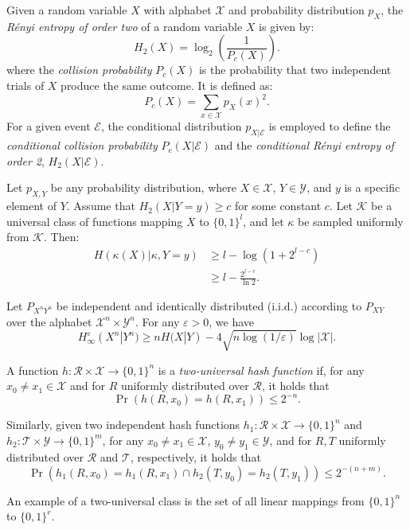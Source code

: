 \documentclass[runningheads]{llncs}
\begin{document}
\begin{definition}\label{Renyi entropy}
    Given a random variable $X$ with alphabet $\mathcal{X}$ and probability distribution $p_X$, the \textit{Rényi entropy of order two} of a random variable $X$ is given by:
    \[
    H_2 (X) = \log_2\left(\frac{1}{P_c(X)}\right).
    \]
    where the \textit{collision probability} $P_c(X)$ is the probability that two independent trials of $X$ produce the same outcome. It is defined as:
    \[
    P_c(X) = \sum_{x \in \mathcal{X}} p_X(x)^2.
    \]
    For a given event $\mathcal{E}$, the conditional distribution $p_{X|\mathcal{E}}$ is employed to define the \textit{conditional collision probability} $P_c(X|\mathcal{E})$ and the \textit{conditional Rényi entropy of order 2}, $H_2(X|\mathcal{E})$.
\end{definition}
\begin{lemma}\cite[Corollary 4]{Bennet}\label{entropy hash}
Let $p_{X,Y}$ be any probability distribution, where $X \in \mathcal{X}$, $Y \in \mathcal{Y}$, and $y$ is a specific element of $Y$. Assume that $H_2(X|Y = y) \geq c$ for some constant $c$. Let $\mathcal{K}$ be a universal class of functions mapping $X$ to $\{0,1\}^l$, and let $\kappa$ be sampled uniformly from $\mathcal{K}$. Then:
\begin{align*}
    H(\kappa(X)|\kappa, Y = y) & \geq l - \log(1 + 2^{l-c})\\
    & \geq l - \frac{2^{l-c}}{\ln 2}.
\end{align*}
\end{lemma} 
\begin{lemma}\cite[
Corollary 2.12]{Holenstein}\label{lemm: Holenstein}
    Let $P_{X^nY^n}$ be independent and identically distributed (i.i.d.) according to $P_{XY}$ over the alphabet $\mathcal{X}^n \times \mathcal{Y}^n$. For any $\varepsilon > 0$, we have
\[
H_\infty^\varepsilon(X^n | Y^n) \geq nH(X | Y) - 4\sqrt{n \log(1/\varepsilon)}\log|\mathcal{X}|.
\]
\end{lemma}
\begin{definition}\label{Hash}
A function $h: \mathcal{R} \times \mathcal{X} \to \{0,1\}^n$ is a \textit{two-universal hash function} \cite{Carter} if, for any $x_0 \neq x_1 \in \mathcal{X}$ and for $R$ uniformly distributed over $\mathcal{R}$, it holds that
\begin{equation}\label{eq: hashs}
    \Pr(h(R, x_0) = h(R, x_1)) \leq 2^{-n}.
\end{equation}

Similarly, given two independent hash functions $h_1: \mathcal{R} \times \mathcal{X} \to \{0,1\}^n$ and $h_2: \mathcal{T} \times \mathcal{Y} \to \{0,1\}^m$, for any $x_0 \neq x_1 \in \mathcal{X}$, $y_0 \neq y_1 \in \mathcal{Y}$, and for $R, T$ uniformly distributed over $\mathcal{R}$ and $\mathcal{T}$, respectively, it holds that
\begin{equation}\label{eq: hashs-double}
    \Pr(h_1(R, x_0) = h_1(R, x_1)\cap h_2(T, y_0) = h_2(T, y_1)) \leq 2^{-(n+m)}.
\end{equation}

 An example of a two-universal class is the set of all linear mappings from $\{0,1\}^n$ to $\{0,1\}^r$. 
 \end{definition}
\end{document}
